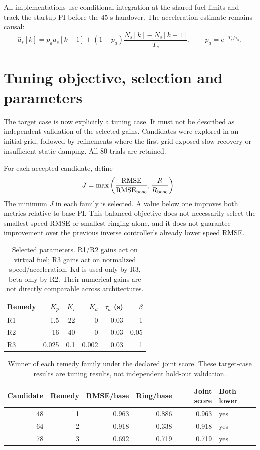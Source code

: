 \documentclass[11pt,a4paper]{article}
\begin{document}
All implementations use conditional integration at the shared fuel limits and track the startup PI before the 45 s handover. The acceleration estimate remains causal:
\begin{equation}
\hat a_s[k]=p_a\hat a_s[k-1]+(1-p_a)\frac{N_s[k]-N_s[k-1]}{T_s},\qquad p_a=e^{-T_s/\tau_a}.
\end{equation}

\section{Tuning objective, selection and parameters}
The target case is now explicitly a tuning case. It must not be described as independent validation of the selected gains. Candidates were explored in an initial grid, followed by refinements where the first grid exposed slow recovery or insufficient static damping. All 80 trials are retained.

For each accepted candidate, define
\begin{equation}
J=\max\left(\frac{\mathrm{RMSE}}{\mathrm{RMSE}_{\rm base}},\frac{R}{R_{\rm base}}\right).
\end{equation}
The minimum $J$ in each family is selected. A value below one improves both metrics relative to base PI. This balanced objective does not necessarily select the smallest speed RMSE or smallest ringing alone, and it does not guarantee improvement over the previous inverse controller's already lower speed RMSE.

\begin{table}[H]\centering\small\setlength{\tabcolsep}{5pt}
\begin{tabular}{@{}lrrrrr@{}}\toprule
Remedy & $K_p$ & $K_i$ & $K_d$ & $\tau_a$ (s) & $\beta$\\\midrule
R1 & 1.5 & 22 & 0 & 0.03 & 1\\
R2 & 16 & 40 & 0 & 0.03 & 0.05\\
R3 & 0.025 & 0.1 & 0.002 & 0.03 & 1\\
\bottomrule\end{tabular}\caption{Selected parameters. R1/R2 gains act on virtual fuel; R3 gains act on normalized speed/acceleration. Kd is used only by R3, beta only by R2. Their numerical gains are not directly comparable across architectures.}\end{table}

\begin{table}[H]\centering\small\setlength{\tabcolsep}{5pt}
\begin{tabular}{@{}rrrrrl@{}}\toprule
Candidate & Remedy & RMSE/base & Ring/base & Joint score & Both lower\\\midrule
48 & 1 & 0.963 & 0.886 & 0.963 & yes\\
64 & 2 & 0.918 & 0.338 & 0.918 & yes\\
78 & 3 & 0.692 & 0.719 & 0.719 & yes\\
\bottomrule\end{tabular}\caption{Winner of each remedy family under the declared joint score. These target-case results are tuning results, not independent hold-out validation.}\end{table}
\end{document}
